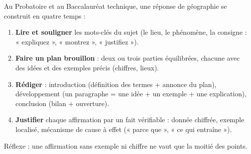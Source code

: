 \documentclass[11pt]{article}
\begin{document}
\begin{methode}
Au Probatoire et au Baccalauréat technique, une réponse de géographie se construit en quatre temps :
\begin{enumerate}
\item \textbf{Lire et souligner} les mots-clés du sujet (le lieu, le phénomène, la consigne : « expliquez », « montrez », « justifiez »).
\item \textbf{Faire un plan brouillon} : deux ou trois parties équilibrées, chacune avec des idées et des exemples précis (chiffres, lieux).
\item \textbf{Rédiger} : introduction (définition des termes + annonce du plan), développement (un paragraphe = une idée + un exemple + une explication), conclusion (bilan + ouverture).
\item \textbf{Justifier} chaque affirmation par un fait vérifiable : donnée chiffrée, exemple localisé, mécanisme de cause à effet (« parce que », « ce qui entraîne »).
\end{enumerate}
Réflexe : une affirmation sans exemple ni chiffre ne vaut que la moitié des points.
\end{methode}
\end{document}
